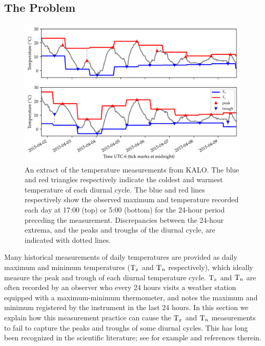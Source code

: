 \documentclass[12pt]{article}
\begin{document}
\subsection{The Problem} 
\label{sec:theproblem}
\label{sec:illustrate_bias}

\begin{figure}[tbp]
\centering
\includegraphics[height=0.4\textheight,width=0.99\textwidth,keepaspectratio]{../figures/waterloo_triangles.png}
\caption{
\label{fig:waterloo_triangles}
An extract of the temperature measurements from KALO.
The blue and red triangles respectively indicate the coldest and warmest temperature of each diurnal cycle.
The blue and red lines respectively show the observed maximum and temperature recorded each day at 17:00 (top) or 5:00 (bottom) for the 24-hour period preceding the measurement.
Discrepancies between the 24-hour extrema, and the peaks and troughs of the diurnal cycle, are indicated with dotted lines.
}
\end{figure}

Many historical measurements of daily temperatures are provided as daily maximum and minimum temperatures (\(\mathrm{T}_{x}\) and \(\mathrm{T}_{n}\) respectively), which ideally measure the peak and trough of each diurnal temperature cycle. 
\(\mathrm{T}_{x}\) and \(\mathrm{T}_{n}\) are often recorded by an observer who every 24 hours visits a weather station equipped with a maximum-minimum thermometer, and notes the maximum and minimum registered by the instrument in the last 24 hours.
In this section we explain how this measurement practice can cause the \(\mathrm{T}_{x}\) and \(\mathrm{T}_{n}\) measurements to fail to capture the peaks and troughs of some diurnal cycles.
This has long been recognized in the scientific literature; see for example \citet{baker1975effect} and references therein.
\end{document}
